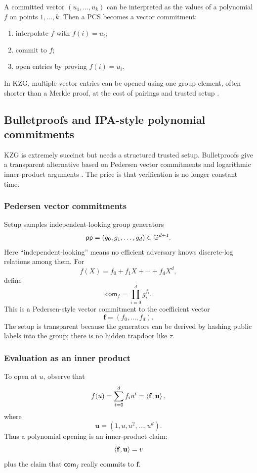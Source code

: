 A committed vector $(u_1,\dots,u_k)$ can be interpreted as the values of a polynomial $f$ on points $1,\dots,k$. Then a PCS becomes a vector commitment:
\begin{enumerate}[leftmargin=2em]
    \item interpolate $f$ with $f(i)=u_i$;
    \item commit to $f$;
    \item open entries by proving $f(i)=u_i$.
\end{enumerate}
In KZG, multiple vector entries can be opened using one group element, often shorter than a Merkle proof, at the cost of pairings and trusted setup \cite{KateZaveruchaGoldberg2010}.

\subsection{Bulletproofs and IPA-style polynomial commitments}

KZG is extremely succinct but needs a structured trusted setup. Bulletproofs give a transparent alternative based on Pedersen vector commitments and logarithmic inner-product arguments \cite{Pedersen1991,BootleCerulliChaidosGrothPetit2016,Bulletproofs2018}. The price is that verification is no longer constant time.

\subsubsection{Pedersen vector commitments}

Setup samples independent-looking group generators
\[
    \mathsf{pp}=(g_0,g_1,\ldots,g_d)\in \mathbb{G}^{d+1}.
\]
Here ``independent-looking'' means no efficient adversary knows discrete-log relations among them. For
\[
    f(X)=f_0+f_1X+\cdots+f_dX^d,
\]
define
\[
    \mathsf{com}_f=\prod_{i=0}^{d} g_i^{f_i}.
\]
This is a Pedersen-style vector commitment to the coefficient vector
\[
    \mathbf f=(f_0,\ldots,f_d).
\]
The setup is transparent because the generators can be derived by hashing public labels into the group; there is no hidden trapdoor like $\tau$.

\subsubsection{Evaluation as an inner product}

To open at $u$, observe that
\[
    f(u)=\sum_{i=0}^{d}f_i u^i
    =\left\langle \mathbf f,\mathbf u\right\rangle,
\]
where
\[
    \mathbf u=(1,u,u^2,\ldots,u^d).
\]
Thus a polynomial opening is an inner-product claim:
\[
    \left\langle \mathbf f,\mathbf u\right\rangle=v
\]
plus the claim that $\mathsf{com}_f$ really commits to $\mathbf f$.

